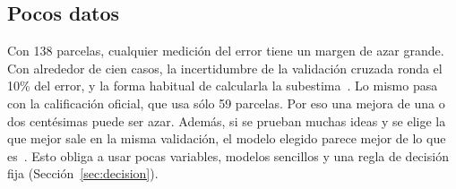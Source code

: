 \subsection{Pocos datos}
Con 138 parcelas, cualquier medición del error tiene un margen de azar grande. Con alrededor de cien casos, la
incertidumbre de la validación cruzada ronda el 10\% del error, y la forma habitual de calcularla la
subestima~\cite{varoquaux2018}. Lo mismo pasa con la calificación oficial, que usa sólo 59 parcelas. Por eso una
mejora de una o dos centésimas puede ser azar. Además, si se prueban muchas ideas y se elige la que mejor sale en la
misma validación, el modelo elegido parece mejor de lo que es~\cite{cawley2010}. Esto obliga a usar pocas variables,
modelos sencillos y una regla de decisión fija (Sección~\ref{sec:decision}).
